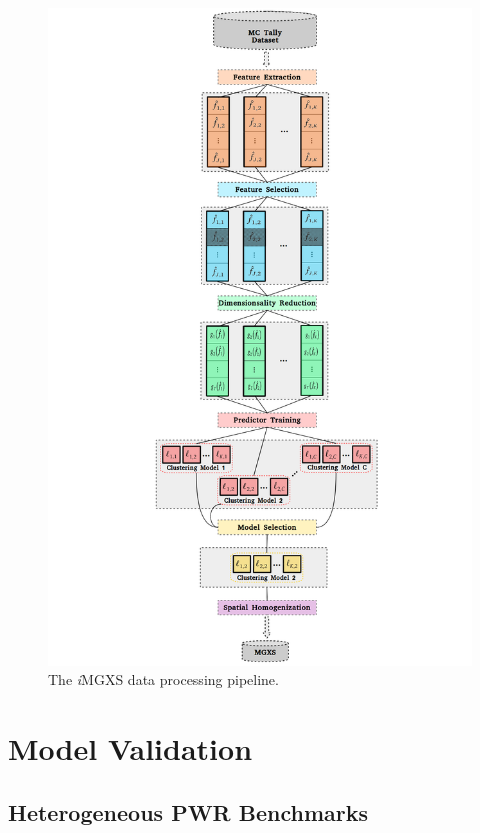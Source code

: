 \documentclass[12pt,twoside]{mitthesis-exec}
\begin{document}
\begin{figure}[h!]
\centering
\includegraphics[width=0.88\linewidth]{figures/unsupervised/features/engineering/flow-chart}
\vspace{2mm}
\caption[\textit{i}MGXS flow chart]{The \textit{i}MGXS data processing pipeline.}
\label{fig:imgxs-flow-chart}
\end{figure}


\section*{Model Validation}

\subsection*{Heterogeneous PWR Benchmarks}
\end{document}
